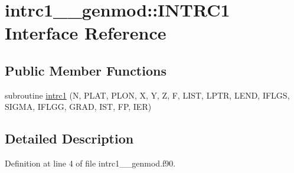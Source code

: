 \hypertarget{interfaceintrc1____genmod_1_1INTRC1}{\section{intrc1\+\_\+\+\_\+genmod\+:\+:I\+N\+T\+R\+C1 Interface Reference}
\label{interfaceintrc1____genmod_1_1INTRC1}
}
\subsection*{Public Member Functions}
\begin{DoxyCompactItemize}
\item 
subroutine \hyperlink{interfaceintrc1____genmod_1_1INTRC1_a013e54693bd756a10f30a71668b2b6e7}{intrc1} (N, P\+L\+A\+T, P\+L\+O\+N, X, Y, Z, F, L\+I\+S\+T, L\+P\+T\+R, L\+E\+N\+D, I\+F\+L\+G\+S, S\+I\+G\+M\+A, I\+F\+L\+G\+G, G\+R\+A\+D, I\+S\+T, F\+P, I\+E\+R)
\end{DoxyCompactItemize}


\subsection{Detailed Description}


Definition at line 4 of file intrc1\+\_\+\+\_\+genmod.\+f90.



